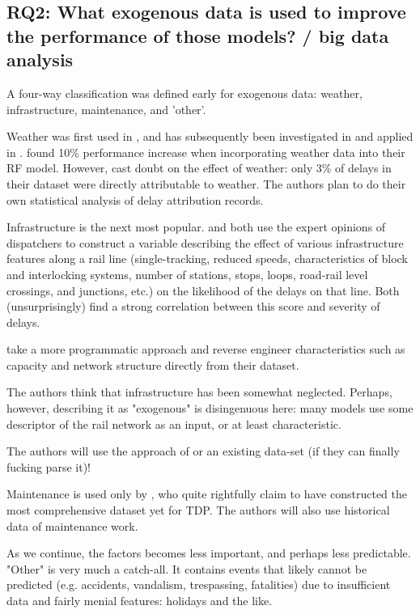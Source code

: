 \documentclass{article}
\begin{document}
\subsection{RQ2: What exogenous data is used to improve the performance of those models? / big data analysis}

A four-way classification was defined early for exogenous data: weather, infrastructure, maintenance, and 'other'. 

Weather was first used in \cite{oneto_et_al_2016}, and has subsequently been investigated in \cite{brazil_2017} and applied in \cite{wang_et_al_2019}\cite{nair_et_al_2019}\cite{nabian_et_al_2019}. \cite{oneto_et_al_2016} found 10\% performance increase when incorporating weather data into their RF model. However, \cite{nair_et_al_2019} cast doubt on the effect of weather: only 3\% of delays in their dataset were directly attributable to weather. The authors plan to do their own statistical analysis of delay attribution records. 

Infrastructure is the next most popular. \cite{milinkovic_et_al_2013} and \cite{markovic_et_al_2015} both use the expert opinions of dispatchers to construct a variable describing the effect of various infrastructure features along a rail line (single-tracking, reduced speeds, characteristics of block and interlocking systems, number of stations, stops, loops, road-rail level crossings, and junctions, etc.) on the likelihood of the delays on that line. Both (unsurprisingly) find a strong correlation between this score and severity of delays.

\cite{nair_et_al_2019} take a more programmatic approach and reverse engineer characteristics such as capacity and network structure directly from their dataset.

The authors think that infrastructure has been somewhat neglected. Perhaps, however, describing it as "exogenous" is disingenuous here: many models use some descriptor of the rail network as an input, or at least characteristic.

The authors will use the approach of \cite{nair_et_al_2019} or an existing data-set (if they can finally fucking parse it)!

Maintenance is used only by \cite{nair_et_al_2019}, who quite rightfully claim to have constructed the most comprehensive dataset yet for TDP. The authors will also use historical data of maintenance work.

As we continue, the factors becomes less important, and perhaps less predictable. "Other" is very much a catch-all. It contains events that likely cannot be predicted (e.g. accidents, vandalism, trespassing, fatalities) due to insufficient data and fairly menial features: holidays and the like.
\end{document}
